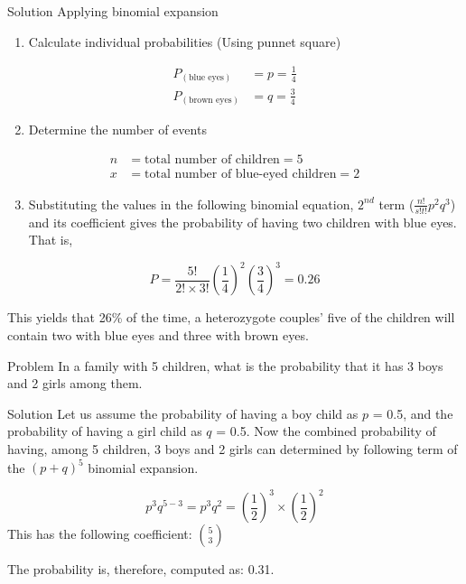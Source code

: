 \documentclass[11pt,ignorenonframetext,aspectratio=169]{beamer}
\providecommand{\tightlist}{%
  \setlength{\itemsep}{0pt}\setlength{\parskip}{0pt}}
\begin{document}
\begin{frame}{Solution}
\protect\hypertarget{solution-1}{}
Applying binomial expansion

\begin{enumerate}
\tightlist
\item
  Calculate individual probabilities (Using punnet square)
\end{enumerate}

\[
\begin{aligned}
P_{(\text{blue eyes})} &= p = \frac{1}{4} \\
P_{(\text{brown eyes})} &= q = \frac{3}{4}
\end{aligned}
\]

\begin{enumerate}
\setcounter{enumi}{1}
\tightlist
\item
  Determine the number of events
\end{enumerate}

\[
\begin{aligned}
n &= \text{total number of children} = 5 \\
x &= \text{total number of blue-eyed children} = 2
\end{aligned}
\]

\begin{enumerate}
\setcounter{enumi}{2}
\tightlist
\item
  Substituting the values in the following binomial equation, \(2^{nd}\)
  term (\(\frac{n!}{s! t!} p^2 q^3\)) and its coefficient gives the
  probability of having two children with blue eyes. That is,
\end{enumerate}

\[
P = \frac{5!}{2! \times 3!} \left(\frac{1}{4}\right)^2 \left(\frac{3}{4}\right)^3 = 0.26
\]

This yields that 26\% of the time, a heterozygote couples' five of the
children will contain two with blue eyes and three with brown eyes.
\end{frame}

\begin{frame}{Problem}
\protect\hypertarget{problem-2}{}
In a family with 5 children, what is the probability that it has 3 boys
and 2 girls among them.
\end{frame}

\begin{frame}{Solution}
\protect\hypertarget{solution-2}{}
Let us assume the probability of having a boy child as \(p\) = 0.5, and
the probability of having a girl child as \(q\) = 0.5. Now the combined
probability of having, among 5 children, 3 boys and 2 girls can
determined by following term of the \((p + q)^5\) binomial expansion.

\[
p^3q^{5-3} = p^3q^{2} = \left(\frac{1}{2}\right)^3 \times \left(\frac{1}{2}\right)^2
\] This has the following coefficient: \(5\choose{3}\)

The probability is, therefore, computed as: 0.31.
\end{frame}
\end{document}
